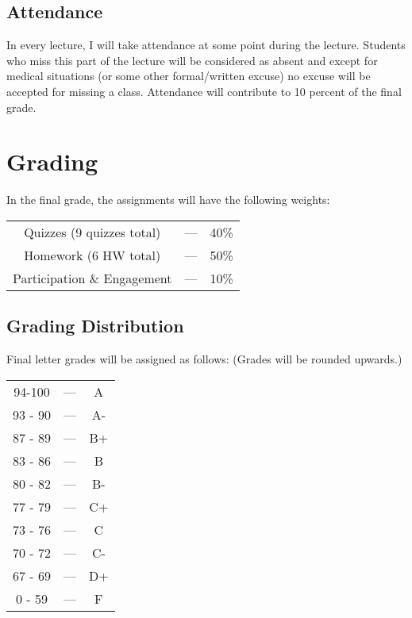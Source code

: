 \documentclass[11pt]{article}
\begin{document}
\subsection*{Attendance}

In every lecture, I will take attendance at some point during the lecture. Students who miss this part of the lecture will be considered as absent and except for medical situations (or some other formal/written excuse) no excuse will be accepted for missing a class. Attendance will contribute to 10 percent of the final grade. 


\section*{Grading}

In the final grade, the assignments will have the following weights:

\begin{center}
	\begin{tabular}{|c|c|c|}
		\hline
		Quizzes (9 quizzes total) & --- & 40\% \\
		Homework (6 HW total)& --- & 50\% \\
		Participation \& Engagement & --- & 10\% \\
		\hline
	\end{tabular}
\end{center}
\subsection*{Grading Distribution}
Final letter grades will be assigned as follows: (Grades will be rounded upwards.)
\newline
\begin{center}
	\begin{tabular}{|c|c|c|}
		\hline
		94-100 & --- & A\\
		 93 - 90 & --- &  A- \\
		 87 - 89 & --- &  B+ \\
		 83 - 86 & --- &  B \\
		 80 - 82 & --- &  B- \\
		 77 - 79 & --- &  C+ \\
		 73 - 76 & --- &  C \\
		 70 - 72 & --- &  C- \\
		 67 - 69 & --- &  D+ \\
		 0 - 59 & --- & F \\
		\hline
	\end{tabular}

\end{center}
	
\end{document}
